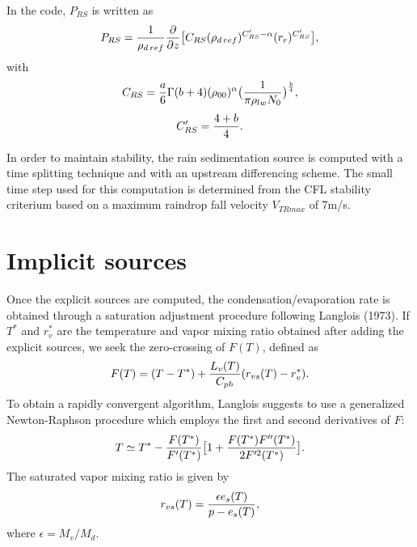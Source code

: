 In the code, $P_{RS}$ is written as
\begin{equation}
P_{RS} = {1 \over \rho_{d\,ref}}{\partial \over \partial z} \big[ C_{RS}
(\rho_{d\,ref})^{C'_{RS}-\alpha} (r_r )^{C'_{RS}}\big],
\end{equation}
with
$$C_{RS}= {a \over 6} \Gamma(b+4)( \rho_{00}) ^\alpha
\big( {1\over \pi \rho_{lw} N_0} \big)^{b \over 4},$$
$$C'_{RS}={4+b \over 4}.$$

In order to maintain stability, the rain sedimentation source is computed with
a time splitting technique and with  an upstream differencing scheme. The small
time step used for this computation is determined from the CFL stability
criterium based on a maximum raindrop fall velocity $V_{TRmax}$ of 7m/s.

\section{Implicit sources}
Once the explicit sources are computed, the condensation/evaporation rate is
obtained through a saturation adjustment procedure following Langlois (1973).
If $T^*$ and $r_v^*$ are the temperature and vapor mixing ratio obtained after
adding the explicit sources, we seek the zero-crossing of $F(T)$, defined as
\begin{equation}
F(T)= (T-T^*) + {L_v(T) \over C_{ph}} (r_{vs}(T)-r_v^*).
\end{equation}
To obtain a rapidly convergent algorithm, Langlois suggests to use a
generalized
Newton-Raphson procedure which employs the first and second derivatives of $F$:
\begin{equation}
T \simeq T^*- {F(T^*) \over F'(T^*)} \big[ 1+ {F(T^*)F''(T^*) \over 2 F'^2(T^*)}\big].
\end{equation}
The saturated vapor mixing ratio is given by
\begin{equation}
r_{vs}(T)= {\epsilon e_s(T) \over p-e_s(T)},
\end{equation}
where $\epsilon = M_v/M_d$.

